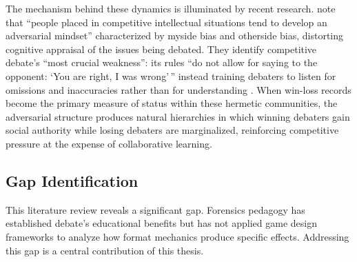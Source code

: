 The mechanism behind these dynamics is illuminated by recent research. \textcite{prussikora2025cracovian} note that ``people placed in competitive intellectual situations tend to develop an adversarial mindset'' characterized by myside bias and otherside bias, distorting cognitive appraisal of the issues being debated. They identify competitive debate's ``most crucial weakness'': its rules ``do not allow for saying to the opponent: `You are right, I was wrong'\,'' instead training debaters to listen for omissions and inaccuracies rather than for understanding \parencite[p.~1474]{prussikora2025cracovian}. When win-loss records become the primary measure of status within these hermetic communities, the adversarial structure produces natural hierarchies in which winning debaters gain social authority while losing debaters are marginalized, reinforcing competitive pressure at the expense of collaborative learning.

\subsection{Gap Identification}

This literature review reveals a significant gap. Forensics pedagogy has established debate's educational benefits but has not applied game design frameworks to analyze how format mechanics produce specific effects. Addressing this gap is a central contribution of this thesis.
